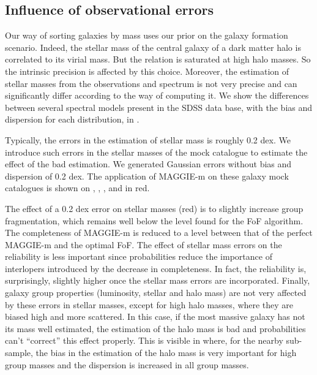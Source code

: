 \subsection{Influence of observational errors}
\label{sub:observational_errors}

Our way of sorting galaxies by mass uses our prior on the galaxy formation
scenario. Indeed, the stellar mass of the central galaxy of a dark matter halo
is correlated to its virial mass. But the relation is saturated at high halo
masses. So the intrinsic precision is affected by this choice. Moreover, the
estimation of stellar masses from the observations and spectrum is not very
precise and can significantly differ according to the way of computing it. We
show the differences between several spectral models present in the SDSS data
base, with the bias and dispersion for each distribution, in
.

Typically, the errors in the estimation of stellar mass is roughly 0.2 dex. We
introduce such errors in the stellar masses of the mock catalogue to estimate
the effect of the bad estimation. We generated Gaussian errors without bias and
dispersion of 0.2 dex. The application of MAGGIE-m on these galaxy mock
catalogues is shown on , ,
,  and
 in red.

The effect of a 0.2 dex error on stellar masses (red) is to slightly increase
group fragmentation, which remains well below the level found for the FoF
algorithm. The completeness of MAGGIE-m is reduced to a level between that of
the perfect MAGGIE-m and the optimal FoF. The effect of stellar mass errors on
the reliability is less important since probabilities reduce the importance of
interlopers introduced by the decrease in completeness. In fact, the
reliability is, surprisingly, slightly higher once the stellar mass errors are
incorporated. Finally, galaxy group properties (luminosity, stellar and halo
mass) are not very affected by these errors in stellar masses, except for high
halo masses, where they are biased high and more scattered. In this case, if
the most massive galaxy has not its mass well estimated, the estimation of the
halo mass is bad and probabilities can't ``correct'' this effect properly. This
is visible in  where, for the nearby
sub-sample, the bias in the estimation of the halo mass is very important for
high group masses and the dispersion is increased in all group masses.

